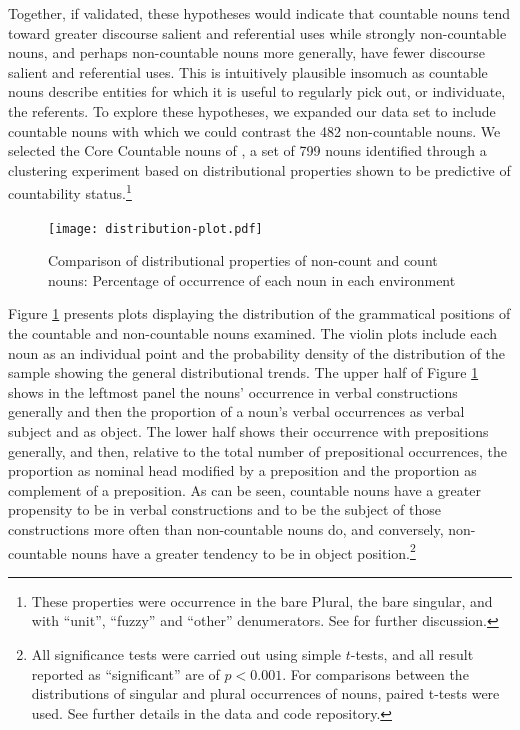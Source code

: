 \documentclass[output=paper]{langscibook}
\begin{document}
Together, if validated, these hypotheses would indicate that countable nouns tend toward greater discourse salient and referential uses while strongly non-countable nouns, and perhaps non-countable nouns more generally, have fewer discourse salient and referential uses.  This is intuitively plausible insomuch as countable nouns describe entities for which it is useful to regularly pick out, or individuate, the referents.  To explore these hypotheses, we expanded our data set to include countable nouns with which we could contrast the 482 non-countable nouns.  We selected the Core Countable nouns of \citet{GrimmWahlang2020}, a set of 799 nouns identified through a clustering experiment based on distributional properties shown to be predictive of countability status.\footnote{These properties were occurrence in the bare Plural, the bare singular, and with ``unit'', ``fuzzy'' and ``other'' denumerators.  See \citet{GrimmWahlang2020} for further discussion.}

\begin{figure}
    \centering
    \texttt{[image: distribution-plot.pdf]}
    \caption{Comparison of distributional properties of non-count and count nouns: Percentage of occurrence of each noun in  each environment}
    \label{gri-ric:fig:distribution}
\end{figure}

Figure \ref{gri-ric:fig:distribution} presents plots displaying the distribution of the grammatical positions of the countable and non-countable nouns examined.  The violin plots include each noun as an individual point and the probability density of the distribution of the sample showing the general distributional trends. The upper half of Figure \ref{gri-ric:fig:distribution} shows in the leftmost panel the nouns' occurrence in verbal constructions generally and then the proportion of a noun's verbal occurrences  as verbal subject and as object.  The lower half shows their occurrence with prepositions generally, and then, relative to the total number of prepositional occurrences, the proportion as nominal head modified by a preposition and the proportion as complement of a preposition.  As can be seen, countable nouns have a greater propensity to be in verbal constructions and to be the subject of those constructions more often than non-countable nouns do, and conversely, non-countable nouns have a greater tendency to be in object position.\footnote{All significance tests were carried out using simple $t$-tests, and all result reported as ``significant'' are of $p<0.001$. For comparisons between the distributions of singular and plural occurrences of nouns, paired t-tests were used. See further details in the data and code repository.}
\end{document}
